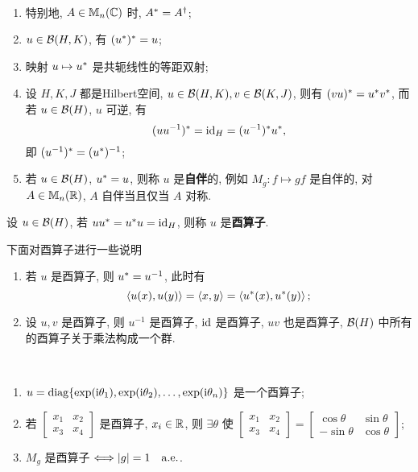 \begin{Remark}~
	\begin{enumerate}[(1)]
		\item 特别地, $ A\in\mathbb{M}_{n}(\mathbb{C}) $ 时, $ A^{*}=A^{\dagger} $;
		\item $ u\in\mathcal{B}(H, K) $, 有 $ (u^{*})^{*}=u $;
		\item 映射 $ u\mapsto u^{*} $ 是共轭线性的等距双射;
		\item 设 $ H, K, J $ 都是Hilbert空间, $ u\in\mathcal{B}(H, K), v\in\mathcal{B}(K, J) $, 则有 $ (vu)^{*}=u^{*}v^{*} $, 而若 $ u\in\mathcal{B}(H) $, $ u $ 可逆, 有
		      \[
			      (uu^{-1})^{*}=\mathrm{id}_{H}=(u^{-1})^{*}u^{*},
		      \]
		      即 $ (u^{-1})^{*}=(u^{*})^{-1} $;
		\item 若 $ u\in\mathcal{B}(H) $, $ u^{*}=u $, 则称 $ u $ 是\textbf{自伴}的, 例如 $ M_{g}: f\mapsto gf $ 是自伴的, 对 $ A\in\mathbb{M}_{n}(\mathbb{R}) $, $ A $ 自伴当且仅当 $ A $ 对称.
	\end{enumerate}
\end{Remark}
\begin{Definition}[酉算子]\label{def:酉算子}
	设 $ u\in \mathcal{B}(H) $, 若 $ uu^{*}=u^{*}u=\mathrm{id}_{H} $, 则称 $ u $ 是\textbf{酉算子}.
\end{Definition}
\begin{Remark}
	下面对酉算子进行一些说明
	\begin{enumerate}[(1)]
		\item 若 $ u $ 是酉算子, 则 $ u^{*}=u^{-1} $, 此时有
		      \[
			      \left\langle u(x), u(y) \right\rangle=\left\langle x, y \right\rangle=\left\langle u^{*}(x), u^{*}(y) \right\rangle;
		      \]
		\item 设 $ u, v $ 是酉算子, 则 $ u^{-1} $ 是酉算子, $ \mathrm{id} $ 是酉算子, $ uv $ 也是酉算子, $ \mathcal{B}(H) $ 中所有的酉算子关于乘法构成一个群.
	\end{enumerate}
\end{Remark}

\begin{Example}~
	\begin{enumerate}[(1)]
		\item $ u=\mathrm{diag}\{ \exp(\mathrm{i} \theta_{1}), \exp(\mathrm{i}\theta_{2}), \dots, \exp(\mathrm{i}\theta_{n}) \} $ 是一个酉算子;
		\item 若
		      $ \left[\begin{smallmatrix}
					      x_{1} & x_{2}\\
					      x_{3} & x_{4}
				      \end{smallmatrix}\right] $ 是酉算子, $ x_{i}\in\mathbb{R} $, 则 $ \exists\theta $ 使
		      $ \left[\begin{smallmatrix}
					      x_{1} & x_{2}\\
					      x_{3} & x_{4}
				      \end{smallmatrix}\right]=\left[\begin{smallmatrix}
					      \cos\theta & \sin\theta \\
					      -\sin\theta & \cos\theta
				      \end{smallmatrix}\right] $;
		\item $ M_{g} $ 是酉算子 $ \Longleftrightarrow\left| g \right| =1\quad \mathrm{a.e.} $.
	\end{enumerate}
\end{Example}

